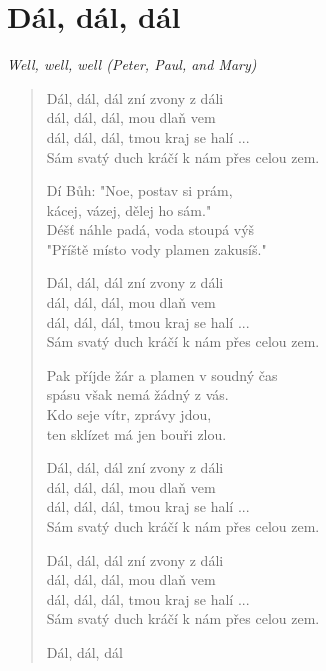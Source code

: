\section{Dál, dál, dál}
\textit{Well, well, well (Peter, Paul, and Mary)}

\begin{verse}
Dál, dál, dál zní zvony z dáli \\
dál, dál, dál, mou dlaň vem \\
dál, dál, dál, tmou kraj se halí ... \\
Sám svatý duch kráčí k nám přes celou zem.

Dí Bůh: "Noe, postav si prám, \\
kácej, vázej, dělej ho sám." \\
Déšť náhle padá, voda stoupá výš \\
"Příště místo vody plamen zakusíš."

Dál, dál, dál zní zvony z dáli \\
dál, dál, dál, mou dlaň vem \\
dál, dál, dál, tmou kraj se halí ... \\
Sám svatý duch kráčí k nám přes celou zem.

Pak příjde žár a plamen v soudný čas \\ 
spásu však nemá žádný z vás. \\
Kdo seje vítr, zprávy jdou, \\
ten sklízet má jen bouři zlou. 

Dál, dál, dál zní zvony z dáli \\
dál, dál, dál, mou dlaň vem \\
dál, dál, dál, tmou kraj se halí ... \\
Sám svatý duch kráčí k nám přes celou zem.

Dál, dál, dál zní zvony z dáli \\
dál, dál, dál, mou dlaň vem \\
dál, dál, dál, tmou kraj se halí ... \\
Sám svatý duch kráčí k nám přes celou zem.

Dál, dál, dál
\end{verse}
